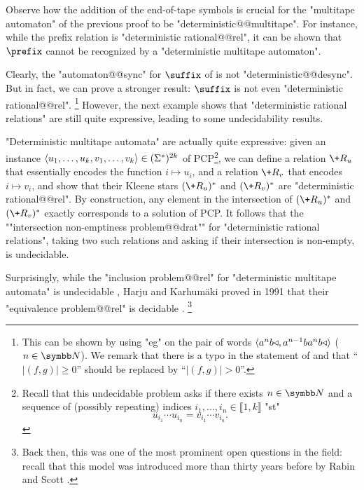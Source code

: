 Observe how the addition of the end-of-tape symbols is crucial for the "multitape automaton"
of the previous proof to be "deterministic@@multitape". For instance, while
the prefix relation is "deterministic rational@@rel", it can be shown that
$\prefix$ cannot be recognized by a "deterministic multitape automaton".

Clearly, the "automaton@@sync" for $\suffix$ of  is not "deterministic@@desync".
But in fact, we can prove a stronger result: $\suffix$ is not even "deterministic rational@@rel".%
\footnote{This can be shown by using "eg"
\cite[Lemma~IV.5.15]{Sakarovitch2009Elements} on the pair of words
$\langle a^n b \triangleleft, a^{n-1} b a^n b \triangleleft\rangle$ ($n\in\N$).
We remark that there is a typo in
the statement of \cite[Lemma~IV.5.15]{Sakarovitch2009Elements} and that
``$|(f,g)| \geq 0$'' should be replaced by ``$|(f,g)| > 0$''.}
However, the next example shows that "deterministic rational relations" are still quite expressive,
leading to some undecidability results.

\begin{example}
	\AP\label{ex:PCP-is-det-rat}
	"Deterministic multitape automata" are actually quite expressive:
	given an instance $\langle u_1,\dotsc,u_k, v_1,\dotsc,v_k\rangle \in (\Sigma^*)^{2k}$ 
	of PCP\footnote{Recall that this undecidable problem asks if there exists $n\in\N$
	and a sequence of (possibly repeating)
	indices $i_1,\dotsc, i_n \in \lBrack 1,k\rBrack$ "st"
	\[u_{i_1}\cdots u_{i_n} = v_{i_1}\cdots v_{i_n}.\]},
	we can define a relation $\+R_u$ that essentially encodes the function
	$i \mapsto u_i$, and a relation $\+R_v$ that encodes $i \mapsto v_i$,
	and show that their Kleene stars $(\+R_u)^*$ and $(\+R_v)^*$ are "deterministic rational@@rel".
	By construction, any element in the intersection of $(\+R_u)^*$ and $(\+R_v)^*$
	exactly corresponds to a solution of PCP.
	It follows that the \AP""intersection non-emptiness problem@@drat""
	for "deterministic rational relations",
	taking two such relations and asking if their intersection is non-empty, is undecidable.
\end{example}

Surprisingly, while the "inclusion problem@@rel" for "deterministic multitape automata" is undecidable
\cite{FischerRosenberg1968Multitape}, Harju and Karhumäki proved in 1991 that their
"equivalence problem@@rel"
is decidable \cite[Theorem~3.11]{HarjuKarhumaki1991Equivalence}.%
\footnote{Back then, this was one of the most prominent open questions in the field: recall that 
this model was introduced more than thirty years before by Rabin
and Scott \cite{RabinScott1959FiniteAutomata}.}

